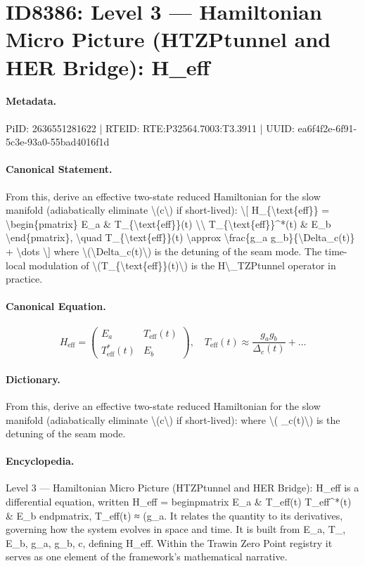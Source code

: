 \section*{ID8386: Level 3 — Hamiltonian Micro Picture (HTZPtunnel and HER Bridge): H\_eff}
\paragraph{Metadata.}
PiID: 2636551281622 | RTEID: RTE:P32564.7003:T3.3911 | UUID: ea6f4f2e-6f91-5c3e-93a0-55bad4016f1d

\paragraph{Canonical Statement.}
From this, derive an effective two-state reduced Hamiltonian for the slow manifold (adiabatically eliminate \textbackslash{}(c\textbackslash{}) if short-lived): \textbackslash{}[ H\_\{\textbackslash{}text\{eff\}\} = \textbackslash{}begin\{pmatrix\} E\_a \& T\_\{\textbackslash{}text\{eff\}\}(t) \textbackslash{}\textbackslash{} T\_\{\textbackslash{}text\{eff\}\}\textasciicircum{}*(t) \& E\_b \textbackslash{}end\{pmatrix\}, \textbackslash{}quad T\_\{\textbackslash{}text\{eff\}\}(t) \textbackslash{}approx \textbackslash{}frac\{g\_a g\_b\}\{\textbackslash{}Delta\_c(t)\} + \textbackslash{}dots \textbackslash{}] where \textbackslash{}(\textbackslash{}Delta\_c(t)\textbackslash{}) is the detuning of the seam mode. The time-local modulation of \textbackslash{}(T\_\{\textbackslash{}text\{eff\}\}(t)\textbackslash{}) is the H\textbackslash{}\_TZPtunnel operator in practice.

\paragraph{Canonical Equation.}
\[
H_{\text{eff}} = \begin{pmatrix} E_a & T_{\text{eff}}(t) \\ T_{\text{eff}}^*(t) & E_b \end{pmatrix}, \quad T_{\text{eff}}(t) \approx \frac{g_a g_b}{\Delta_c(t)} + \dots
\]

\paragraph{Dictionary.}
From this, derive an effective two-state reduced Hamiltonian for the slow manifold (adiabatically eliminate \textbackslash{}(c\textbackslash{}) if short-lived): where \textbackslash{}( \_c(t)\textbackslash{}) is the detuning of the seam mode.

\paragraph{Encyclopedia.}
Level 3 — Hamiltonian Micro Picture (HTZPtunnel and HER Bridge): H\_eff is a differential equation, written H\_eff = beginpmatrix E\_a \& T\_eff(t) T\_eff\textasciicircum{}*(t) \& E\_b endpmatrix, T\_eff(t) ≈ (g\_a. It relates the quantity to its derivatives, governing how the system evolves in space and time. It is built from E\_a, T\_, E\_b, g\_a, g\_b, c, defining H\_eff. Within the Trawin Zero Point registry it serves as one element of the framework's mathematical narrative.
